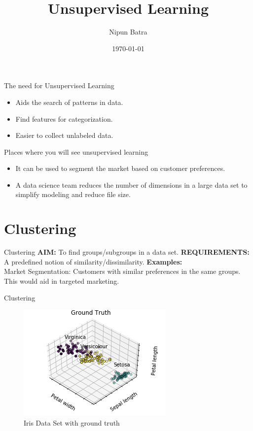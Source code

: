 \documentclass{beamer}
\title{Unsupervised Learning}
\date{\today}
\author{Nipun Batra}
\institute{IIT Gandhinagar}
\begin{document}
  \maketitle

\begin{frame}{The need for Unsupervised Learning}
\begin{itemize}
\item Aids the search of patterns in data.
\item Find features for categorization.
\item Easier to collect unlabeled data.
\end{itemize}
\pause
Places where you will see unsupervised learning 
\begin{itemize}
\item It can be used to segment the market based on customer preferences.
\item A data science team reduces the number of dimensions in a large data set to simplify modeling and reduce file size.
\end{itemize}
\end{frame}

\section{Clustering}

\begin{frame}{Clustering}
\textbf{AIM:} To find groups/subgroups in a data set.
\pause
\textbf{REQUIREMENTS:} A predefined notion of similarity/dissimilarity.
\pause
\textbf{Examples:} \\
Market Segmentation: Customers with similar preferences in the same groups. This would aid in targeted marketing.
\end{frame}

\begin{frame}{Clustering}
\begin{figure}[htp]
    \centering
    \includegraphics[width=0.7\linewidth]{unsupervised/gt_iris.png}
    \caption{Iris Data Set with ground truth}
\end{figure}
\end{frame}
\end{document}

